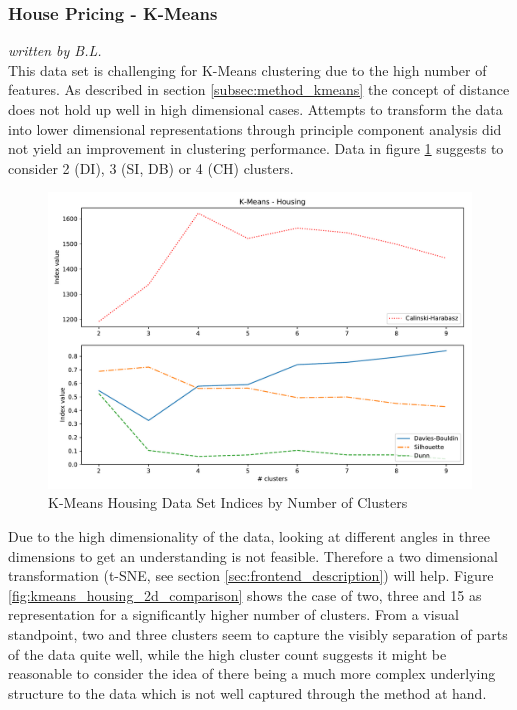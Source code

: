 \subsubsection{House Pricing - K-Means}
\textit{written by B.L.}\\

This data set is challenging for K-Means clustering due to the high number of features. As described in section \ref{subsec:method_kmeans} the concept of distance does not hold up well in high dimensional cases. Attempts to transform the data into lower dimensional representations through principle component analysis did not yield an improvement in clustering performance. Data in figure \ref{fig:kmeans_housing_indices_plot} suggests to consider 2 (\gls{DI}), 3 (\gls{SI}, \gls{DB}) or 4 (\gls{CH}) clusters.

\begin{figure}[H]
\begin{center}
\includegraphics[width=1.0\textwidth]{images/kmeans_housing_index_plot.pdf}
\caption{K-Means Housing Data Set Indices by Number of Clusters}
\end{center}
\label{fig:kmeans_housing_indices_plot}
\end{figure}

Due to the high dimensionality of the data, looking at different angles in three dimensions to get an understanding is not feasible. Therefore a two dimensional transformation (t-SNE, see section \ref{sec:frontend_description}) will help. Figure \ref{fig:kmeans_housing_2d_comparison} shows the case of two, three and 15 as representation for a significantly higher number of clusters. From a visual standpoint, two and three clusters seem to capture the visibly separation of parts of the data quite well, while the high cluster count suggests it might be reasonable to consider the idea of there being a much more complex underlying structure to the data which is not well captured through the method at hand.

